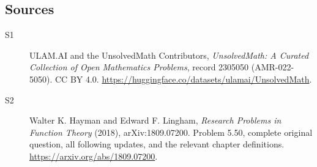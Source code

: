 \documentclass[11pt]{book}
\begin{document}
\subsection{Sources}
\begin{description}
\item[\hypertarget{source:2305050:1}{S1}] ULAM.AI and the UnsolvedMath Contributors, \emph{UnsolvedMath: A Curated Collection of Open Mathematics Problems}, record 2305050 (AMR-022-5050). CC BY 4.0. \url{https://huggingface.co/datasets/ulamai/UnsolvedMath}.
\item[\hypertarget{source:2305050:2}{S2}] Walter K. Hayman and Edward F. Lingham, \emph{Research Problems in Function Theory} (2018), arXiv:1809.07200. Problem 5.50, complete original question, all following updates, and the relevant chapter definitions. \url{https://arxiv.org/abs/1809.07200}.
\end{description}
\label{end:2305050}
\end{document}
